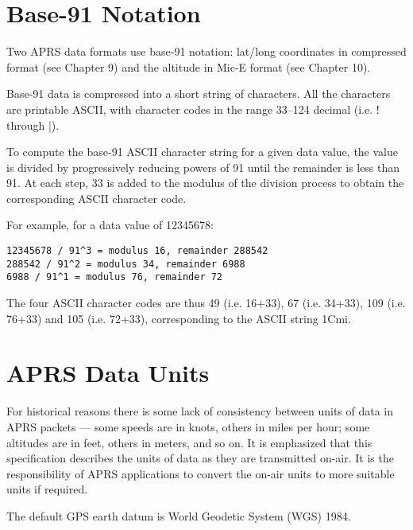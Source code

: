 \section{Base-91 Notation}

Two APRS data formats use base-91 notation: lat/long coordinates in
compressed format (see Chapter 9) and the altitude in Mic-E format (see
Chapter 10).

Base-91 data is compressed into a short string of characters. All the
characters are printable ASCII, with character codes in the range 33–124
decimal (i.e. ! through |).

To compute the base-91 ASCII character string for a given data value, the
value is divided by progressively reducing powers of 91 until the remainder
is less than 91. At each step, 33 is added to the modulus of the division
process to obtain the corresponding ASCII character code.

For example, for a data value of 12345678:
\begin{verbatim}
12345678 / 91^3 = modulus 16, remainder 288542
288542 / 91^2 = modulus 34, remainder 6988
6988 / 91^1 = modulus 76, remainder 72
\end{verbatim}

The four ASCII character codes are thus 49 (i.e. 16+33), 67 (i.e. 34+33), 109
(i.e. 76+33) and 105 (i.e. 72+33), corresponding to the ASCII string 1Cmi.

\section{APRS Data Units}

For historical reasons there is some lack of consistency between units of data
in APRS packets — some speeds are in knots, others in miles per hour; some
altitudes are in feet, others in meters, and so on. It is emphasized that this
specification describes the units of data as they are transmitted on-air. It is
the responsibility of APRS applications to convert the on-air units to more
suitable units if required.

The default GPS earth datum is World Geodetic System (WGS) 1984.


